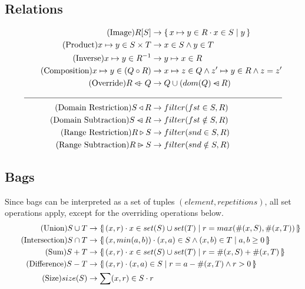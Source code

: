 \documentclass{article}
\newcommand{\bSet}[3]{%
  \{\, #1 \cdot #2 \mid #3 \, \}%
}
\newcommand{\lbbar}{\{\kern-0.5ex|}
\newcommand{\rbbar}{|\kern-0.5ex\}}
\newcommand{\bag}[3]{%
  \lbbar \, #1 \cdot #2 \mid #3 \, \rbbar%
}
\begin{document}
\subsection{Relations}
  \begin{align}
  \tag{Image}
  R[S] &\rightarrow \bSet{x \mapsto y \in R}{x \in S}{y}
  \\
  \tag{Product}
  x \mapsto y \in S \times T &\rightarrow x \in S \land y \in T
  \\
  \tag{Inverse}
  x \mapsto y \in R^{-1} &\rightarrow y \mapsto x \in R
  \\
  \tag{Composition}
  x \mapsto y \in (Q \circ R) &\rightarrow x \mapsto z \in Q \land z' \mapsto y \in R \land z=z'
  \\
  \tag{Override}
  R \ovl Q &\rightarrow Q \cup (dom(Q) \domsub R)
  \\
  \cline{1-2}
  \tag{Domain Restriction}
  S \triangleleft R &\rightarrow filter(fst \in S, R)
  \\
  \tag{Domain Subtraction}
  S \domsub R &\rightarrow filter(fst \notin S, R)
  \\
  \tag{Range Restriction}
  R \triangleright S &\rightarrow filter(snd \in S, R)
  \\
  \tag{Range Subtraction}
  R \ransub S &\rightarrow filter(snd \notin S, R)
\end{align}

\subsection{Bags}
Since bags can be interpreted as a set of tuples $(element, repetitions)$, all set operations apply, except for the overriding operations below.
\begin{align}
  \tag{Union}
  S \cup T &\rightarrow \bag{(x, r)}{x \in set(S) \cup set(T)}{r = max(\#(x,S), \#(x,T))}
  \\
  \tag{Intersection}
  S \cap T &\rightarrow \bag{(x, min(a,b))}{(x,a) \in S \land (x,b) \in T}{a, b \geq 0}
  \\
  \tag{Sum}
  S + T &\rightarrow \bag{(x, r)}{x \in set(S) \cup set(T)}{r = \#(x,S) + \#(x, T)}
  \\
  \tag{Difference}
  S - T &\rightarrow \bag{(x, r)}{(x,a) \in S}{r = a-\#(x, T) \land r > 0}
  \\
  \tag{Size}
  size(S) &\rightarrow \sum (x,r) \in S \cdot r
\end{align}
\end{document}
